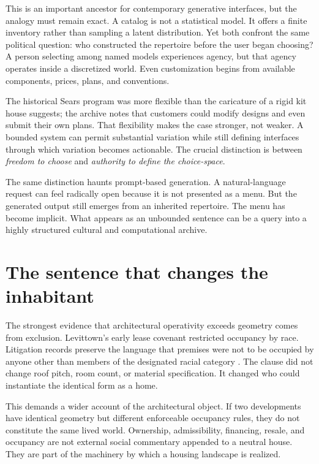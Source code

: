 \documentclass[11pt]{article}
\begin{document}
This is an important ancestor for contemporary generative interfaces, but the analogy must remain exact. A catalog is not a statistical model. It offers a finite inventory rather than sampling a latent distribution. Yet both confront the same political question: who constructed the repertoire before the user began choosing? A person selecting among named models experiences agency, but that agency operates inside a discretized world. Even customization begins from available components, prices, plans, and conventions.

The historical Sears program was more flexible than the caricature of a rigid kit house suggests; the archive notes that customers could modify designs and even submit their own plans. That flexibility makes the case stronger, not weaker. A bounded system can permit substantial variation while still defining interfaces through which variation becomes actionable. The crucial distinction is between \emph{freedom to choose} and \emph{authority to define the choice-space}.

The same distinction haunts prompt-based generation. A natural-language request can feel radically open because it is not presented as a menu. But the generated output still emerges from an inherited repertoire. The menu has become implicit. What appears as an unbounded sentence can be a query into a highly structured cultural and computational archive.

\section{The sentence that changes the inhabitant}
The strongest evidence that architectural operativity exceeds geometry comes from exclusion. Levittown's early lease covenant restricted occupancy by race. Litigation records preserve the language that premises were not to be occupied by anyone other than members of the designated racial category \citep{levittLease1948}. The clause did not change roof pitch, room count, or material specification. It changed who could instantiate the identical form as a home.

This demands a wider account of the architectural object. If two developments have identical geometry but different enforceable occupancy rules, they do not constitute the same lived world. Ownership, admissibility, financing, resale, and occupancy are not external social commentary appended to a neutral house. They are part of the machinery by which a housing landscape is realized.
\end{document}
